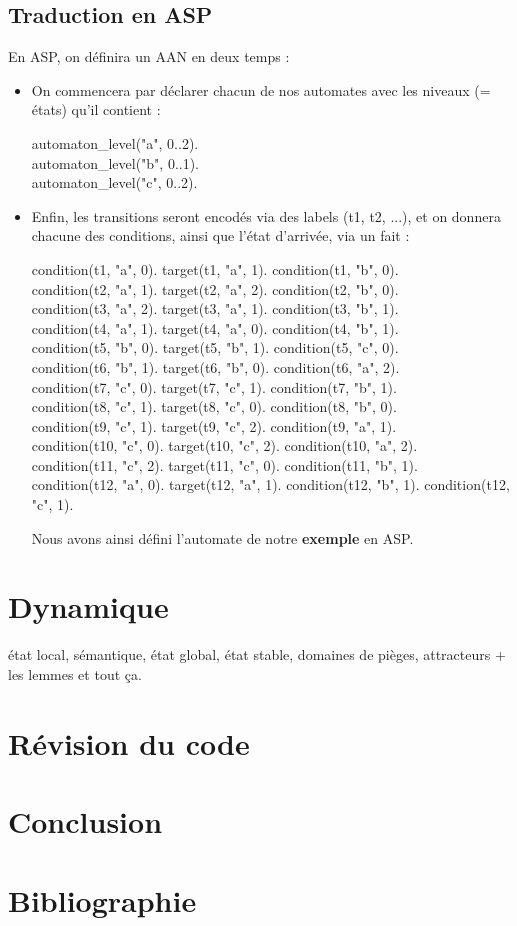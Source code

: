 \documentclass[12pt,a4paper]{article}
\begin{document}
\subsection{Traduction en ASP}
En ASP, on définira un AAN en deux temps :
\begin{itemize}
	\item On commencera par déclarer chacun de nos automates avec les niveaux (= états) qu'il contient :
	\begin {center}
	automaton\_level("a", 0..2).\\
	automaton\_level("b", 0..1).\\
	automaton\_level("c", 0..2).\\
	\end{center}
	\item Enfin, les transitions seront encodés via des labels (t1, t2, ...), et on donnera chacune des conditions, ainsi que l'état d'arrivée, via un fait :
	\begin {center}
	condition(t1, "a", 0). target(t1, "a", 1). condition(t1, "b", 0).\\
	condition(t2, "a", 1). target(t2, "a", 2). condition(t2, "b", 0).\\
	condition(t3, "a", 2). target(t3, "a", 1). condition(t3, "b", 1).\\
	condition(t4, "a", 1). target(t4, "a", 0). condition(t4, "b", 1).\\
	condition(t5, "b", 0). target(t5, "b", 1). condition(t5, "c", 0).\\
	condition(t6, "b", 1). target(t6, "b", 0). condition(t6, "a", 2).\\
	condition(t7, "c", 0). target(t7, "c", 1). condition(t7, "b", 1).\\
	condition(t8, "c", 1). target(t8, "c", 0). condition(t8, "b", 0).\\
	condition(t9, "c", 1). target(t9, "c", 2). condition(t9, "a", 1).\\
	condition(t10, "c", 0). target(t10, "c", 2). condition(t10, "a", 2).\\
	condition(t11, "c", 2). target(t11, "c", 0). condition(t11, "b", 1).\\
	condition(t12, "a", 0). target(t12, "a", 1). condition(t12, "b", 1). condition(t12, "c", 1).\\
	\end{center}
Nous avons ainsi défini l'automate de notre \textbf{exemple} en ASP.
\end{itemize}

\section{Dynamique}
état local, sémantique, état global, état stable, domaines de pièges,  attracteurs + les lemmes et tout ça.

\section{Révision du code}

\section{Conclusion}

\section{Bibliographie}
\end{document}
